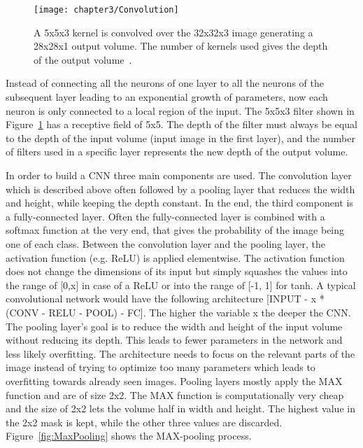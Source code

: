 \begin{figure}[!h]
  \centering
  \caption{A 5x5x3 kernel is convolved over the 32x32x3 image generating a 28x28x1 output volume. The number of kernels used gives the depth of the output volume~\cite{cs231nconvolution}.}
  \texttt{[image: chapter3/Convolution]}
  \label{fig:Convolution}
\end{figure}

\quad

Instead of connecting all the neurons of one layer to all the neurons of the subsequent layer leading to an exponential growth of parameters, now each neuron is only connected to a local region of the input. The 5x5x3 filter shown in Figure~\ref{fig:Convolution} has a receptive field of 5x5. The depth of the filter must always be equal to the depth of the input volume (input image in the first layer), and the number of filters used in a specific layer represents the new depth of the output volume.

In order to build a CNN three main components are used. The convolution layer which is described above often followed by a pooling layer that reduces the width and height, while keeping the depth constant. In the end, the third component is a fully-connected layer. Often the fully-connected layer is combined with a softmax function at the very end, that gives the probability of the image being one of each class. Between the convolution layer and the pooling layer, the activation function (e.g. ReLU) is applied elementwise. The activation function does not change the dimensions of its input but simply squashes the values into the range of [0,x] in case of a ReLU or into the range of [-1, 1] for tanh. A typical convolutional network would have the following architecture [INPUT - x * (CONV - RELU - POOL) - FC]. The higher the variable x the deeper the CNN. The pooling layer's goal is to reduce the width and height of the input volume without reducing its depth. This leads to fewer parameters in the network and less likely overfitting. The architecture needs to focus on the relevant parts of the image instead of trying to optimize too many parameters which leads to overfitting towards already seen images. Pooling layers mostly apply the MAX function and are of size 2x2. The MAX function is computationally very cheap and the size of 2x2 lets the volume half in width and height. The highest value in the 2x2 mask is kept, while the other three values are discarded. Figure~\ref{fig:MaxPooling} shows the MAX-pooling process.\\


